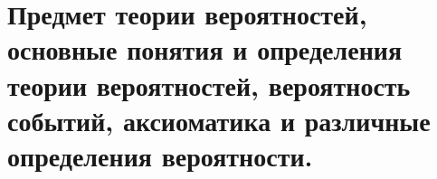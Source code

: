 \documentclass[polytech/stats/exam-2023/stats-exam-2023.tex]{subfiles}
\begin{document}
\section{Предмет теории вероятностей, основные понятия и определения теории вероятностей, вероятность событий, аксиоматика и различные определения вероятности.}
\end{document}

